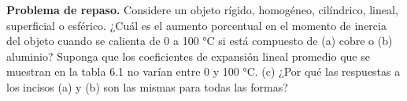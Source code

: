 \item \textbf{Problema de repaso.} Considere un objeto rígido, homogéneo, cilíndrico, lineal, superficial o esférico. ¿Cuál es el aumento porcentual en el momento de inercia del objeto cuando se calienta de 0 a 100 °C si está compuesto de (a) cobre o (b) aluminio? Suponga que los coeficientes de expansión lineal promedio que se muestran en la tabla 6.1 no varían entre 0 y 100 °C. (c) ¿Por qué las respuestas a los incisos (a) y (b) son las mismas para todas las formas?
